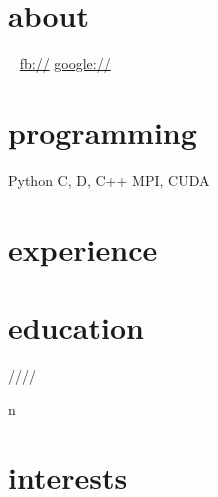 \documentclass[]{fancy-cv}
\begin{document}
\header{\MakeLowercase\myfirstname}{\MakeLowercase\mylastname}

\begin{aside}
  \section{about}
    \myphone
    \myaddress
    \mycity
    ~
    \href{mailto:\myemail}{\myemail}
    \href{\mywebsite}{\mywebsite}
    \href{http://facebook.com/\myfb}{fb://\myfb}
    \href{http://plug.google.com/\mygp}{google://\mygp}
  \section{programming}
    Python
    C, D, C++
    MPI, CUDA
\end{aside}

\section{experience}
\label{sec:experience}


\vspace{-1.5em}

\section{education}
\label{sec:education}

\begin{entrylist}
 \year/\degree/\school/\city/\subtitle in \education {
  \entry{\year}{\degree}{\school}{\subtitle}
}
\end{entrylist}

\section{interests}
\MakeLowercase\interests
\end{document}
